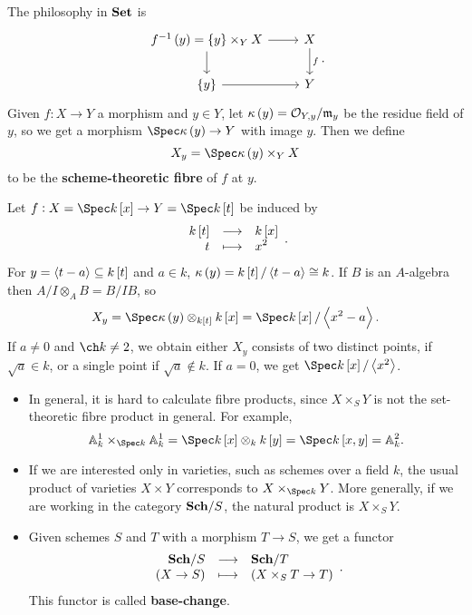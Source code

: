 The philosophy in $ \textbf{Set} $ is
$$
\begin{tikzcd}
f^{-1}\br{y} = \cbr{y} \times_Y X \arrow{r} \arrow{d} & X \arrow{d}{f} \\
\cbr{y} \arrow{r} & Y
\end{tikzcd}.
$$
Given $ f : X \to Y $ a morphism and $ y \in Y $, let $ \kappa\br{y} = \OOO_{Y, y} / \mmm_y $ be the residue field of $ y $, so we get a morphism $ \Spec \kappa\br{y} \to Y $ with image $ y $. Then we define
$$ X_y = \Spec \kappa\br{y} \times_Y X $$
to be the \textbf{scheme-theoretic fibre} of $ f $ at $ y $.

\begin{example*}
Let $ f : X = \Spec k\sbr{x} \to Y = \Spec k\sbr{t} $ be induced by
$$ \function{k\sbr{t}}{k\sbr{x}}{t}{x^2}. $$
For $ y = \abr{t - a} \subseteq k\sbr{t} $ and $ a \in k $, $ \kappa\br{y} = k\sbr{t} / \abr{t - a} \cong k $. If $ B $ is an $ A $-algebra then $ A / I \otimes_A B = B / IB $, so
$$ X_y = \Spec \kappa\br{y} \otimes_{k\sbr{t}} k\sbr{x} = \Spec k\sbr{x} / \abr{x^2 - a}. $$
If $ a \ne 0 $ and $ \ch k \ne 2 $, we obtain either $ X_y $ consists of two distinct points, if $ \sqrt{a} \in k $, or a single point if $ \sqrt{a} \notin k $. If $ a = 0 $, we get $ \Spec k\sbr{x} / \abr{x^2} $.
\end{example*}

\begin{remark*}
\hfill
\begin{itemize}
\item In general, it is hard to calculate fibre products, since $ X \times_S Y $ is not the set-theoretic fibre product in general. For example,
$$ \AA_k^1 \times_{\Spec k} \AA_k^1 = \Spec k\sbr{x} \otimes_k k\sbr{y} = \Spec k\sbr{x, y} = \AA_k^2. $$
\item If we are interested only in varieties, such as schemes over a field $ k $, the usual product of varieties $ X \times Y $ corresponds to $ X \times_{\Spec k} Y $. More generally, if we are working in the category $ \textbf{Sch} / S $, the natural product is $ X \times_S Y $.
\item Given schemes $ S $ and $ T $ with a morphism $ T \to S $, we get a functor
$$ \function{\Sch / S}{\Sch / T}{\br{X \to S}}{\br{X \times_S T \to T}}. $$
This functor is called \textbf{base-change}.
\end{itemize}
\end{remark*}

\pagebreak


